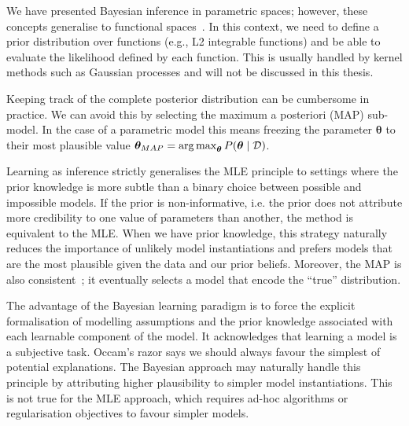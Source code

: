 We have presented Bayesian inference in parametric spaces; however, these concepts generalise to functional spaces~\citep{mackay1998introduction}. In this context, we need to define a prior distribution over functions (e.g., L2 integrable functions) and be able to evaluate the likelihood defined by each function. This is usually handled by kernel methods such as Gaussian processes and will not be discussed in this thesis.

Keeping track of the complete posterior distribution can be cumbersome in practice. We can avoid this by selecting the maximum a posteriori (MAP) sub-model. In the case of a parametric model this means freezing the parameter $\bm \theta$ to their most plausible value $\bm \theta_{MAP} = \operatorname*{arg\,max}_{\bm \theta} P(\bm \theta \mid \mathcal{D})$.

Learning as inference strictly generalises the MLE principle to settings where the prior knowledge is more subtle than a binary choice between possible and impossible models. If the prior is non-informative, i.e. the prior does not attribute more credibility to one value of parameters than another, the method is equivalent to the MLE. When we have prior knowledge, this strategy naturally reduces the importance of unlikely model instantiations and prefers models that are the most plausible given the data and our prior beliefs. Moreover, the MAP is also consistent~\citep{schwartz1965bayes}; it eventually selects a model that encode the ``true'' distribution.

The advantage of the Bayesian learning paradigm is to force the explicit formalisation of modelling assumptions and the prior knowledge associated with each learnable component of the model. It acknowledges that learning a model is a subjective task. Occam's razor says we should always favour the simplest of potential explanations. The Bayesian approach may naturally handle this principle by attributing higher plausibility to simpler model instantiations. This is not true for the MLE approach, which requires ad-hoc algorithms or regularisation objectives to favour simpler models.

%
